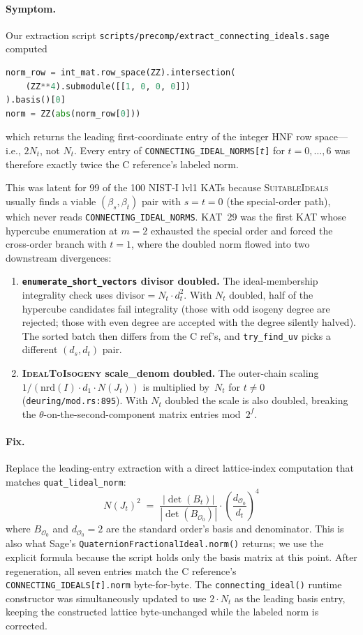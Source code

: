 \paragraph{Symptom.}  Our extraction script
\texttt{scripts/precomp/extract\_connecting\_ideals.sage}
computed
\begin{lstlisting}[language=Python]
norm_row = int_mat.row_space(ZZ).intersection(
    (ZZ**4).submodule([[1, 0, 0, 0]])
).basis()[0]
norm = ZZ(abs(norm_row[0]))
\end{lstlisting}
which returns the leading first-coordinate entry of the integer
HNF row space---i.e., $2 N_t$, not $N_t$.  Every entry of
\texttt{CONNECTING\_IDEAL\_NORMS[\textit{t}]} for
$t = 0, \ldots, 6$ was therefore exactly twice the C reference's
labeled norm.

This was latent for 99 of the 100 NIST-I lvl1 KATs because
\textsc{SuitableIdeals} usually finds a viable $(\beta_s, \beta_t)$
pair with $s = t = 0$ (the special-order path), which never reads
\texttt{CONNECTING\_IDEAL\_NORMS}.  KAT~29 was the first KAT
whose hypercube enumeration at $m = 2$ exhausted the special
order and forced the cross-order branch with $t = 1$, where the
doubled norm flowed into two downstream divergences:
\begin{enumerate}
  \item \textbf{\texttt{enumerate\_short\_vectors} divisor
    doubled.}  The ideal-membership integrality check uses
    $\mathrm{divisor} = N_t \cdot d_t^2$.  With $N_t$ doubled,
    half of the hypercube candidates fail integrality (those
    with odd isogeny degree are rejected; those with even
    degree are accepted with the degree silently halved).  The
    sorted batch then differs from the C ref's, and
    \texttt{try\_find\_uv} picks a different
    $(d_s, d_t)$ pair.
  \item \textbf{\textsc{IdealToIsogeny} scale\_denom doubled.}
    The outer-chain scaling
    $1 / (\mathrm{nrd}(I) \cdot d_1 \cdot N(J_t))$ is multiplied
    by~$N_t$ for $t \neq 0$ (\texttt{deuring/mod.rs:895}).  With
    $N_t$ doubled the scale is also doubled, breaking the
    $\theta$-on-the-second-component matrix entries
    mod~$2^f$.
\end{enumerate}

\paragraph{Fix.}  Replace the leading-entry extraction with a
direct lattice-index computation that matches
\texttt{quat\_lideal\_norm}:
\[
  N(J_t)^2 \;=\; \frac{|\det(B_t)|}{|\det(B_{\mathcal{O}_0})|}
  \cdot
  \left(\frac{d_{\mathcal{O}_0}}{d_t}\right)^4
\]
where $B_{\mathcal{O}_0}$ and $d_{\mathcal{O}_0} = 2$ are the
standard order's basis and denominator.  This is also what
Sage's \texttt{QuaternionFractionalIdeal.norm()} returns; we use
the explicit formula because the script holds only the basis
matrix at this point.  After regeneration, all seven entries
match the C reference's
\texttt{CONNECTING\_IDEALS[\textit{t}].norm}
byte-for-byte.  The \texttt{connecting\_ideal()} runtime
constructor was simultaneously updated to use $2 \cdot N_t$ as
the leading basis entry, keeping the constructed lattice
byte-unchanged while the labeled norm is corrected.

